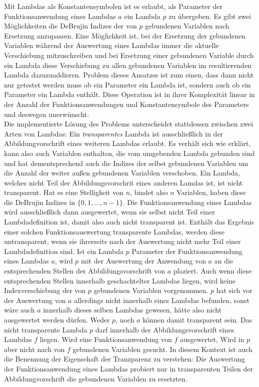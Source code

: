 Mit Lambdas als Konstantensymbolen ist es erlaubt, als Parameter der Funktionsanwendung eines Lambdas $a$ ein Lambda $p$ zu übergeben. Es gibt zwei Möglichkeiten die DeBrujin Indizes der von $p$ gebundenen Variablen nach Ersetzung anzupassen. 
Eine Möglichkeit ist, bei der Ersetzung der gebundenen Variablen während der Auswertung eines Lambdas immer die aktuelle Verschiebung mitzuschreiben und bei Ersetzung einer gebundenen Variable durch ein Lambda diese Verschiebung zu allen gebundenen Variablen im resultierenden Lambda dazuzuaddieren. Problem dieses Ansatzes ist zum einen, dass dann nicht nur getestet werden muss ob ein Parameter ein Lambda ist, sondern auch ob ein Parameter ein Lambda enthält. Diese Operation ist in ihrer Komplexität linear in der Anzahl der Funktionsanwendungen und Konstantensymbole des Parameters und deswegen unerwünscht. \\
Die implementierte Lösung des Problems unterscheidet stattdessen zwischen zwei Arten von Lambdas: Ein \emph{transparentes} Lambda ist ausschließlich in der Abbildungvorschrift eines weiteren Lambdas erlaubt. Es verhält sich wie erklärt, kann also auch Variablen enthalten, die vom umgebenden Lambda gebunden sind und hat dementsprechend auch die Indizes der selbst gebundenen Variablen um die Anzahl der weiter außen gebundenen Variablen verschoben. Ein Lambda, welches nicht Teil der Abbildungsvorschrit eines anderen Lamdas ist, ist nicht transparent. Hat es eine Stelligkeit von $n$, bindet also $n$ Variablen, haben diese die DeBrujin Indizes in $\{0, 1, \dots, n-1\}$. Die Funktionsanwendung eines Lambdas wird ausschließlich dann ausgewertet, wenn sie selbst nicht Teil einer Lambdadefinition ist, damit also auch nicht transparent ist. 
Enthält das Ergebnis einer solchen Funktionsauswertung transparente Lambdas, werden diese untransparent, wenn sie ihrerseits nach der Auswertung nicht mehr Teil einer Lambdadefinition sind. 
Ist ein Lambda $p$ Parameter der Funktionsanwendung eines Lambdas $a$, wird $p$ mit der Auswertung der Anwendung von $a$ an die entsprechenden Stellen der Abbildungsvorschrift von $a$ plaziert. Auch wenn diese entsprechenden Stellen innerhalb geschachtelter Lambdas liegen, wird keine Indexverschiebung der von $p$ gebundenen Variablen vorgenommen. $p$ hat sich vor der Auswertung von $a$ allerdings nicht innerhalb eines Lambdas befunden, sonst wäre auch $a$ innerhalb dieses selben Lambdas gewesen, hätte also nicht ausgewertet werden dürfen. Weder $p$, noch $a$ können damit transparent sein. Das nicht transparente Lambda $p$ darf innerhalb der Abbildungsvorschrift eines Lambdas $f$ liegen. Wird eine Funktionsanwendung von $f$ ausgewertet, Wird in $p$ aber nicht nach von $f$ gebundenen Variablen gesucht. In diesem Kontext ist auch die Benennung der Eigenschaft der Tranzparenz zu verstehen: Die Auswertung der Funktionsanwendung eines Lambdas probiert nur in transparenten Teilen der Abbildungvorschrift die gebundenen Variablen zu ersetzten.\\
